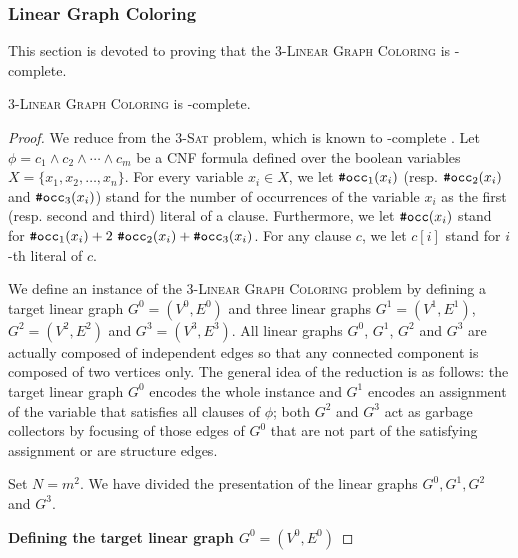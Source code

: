 \subsubsection{Linear Graph Coloring}
\label{section:Linear Graph Coloring}

This section is devoted to proving that the
\textsc{$3$-Linear Graph Coloring} is \NP-complete.

\begin{proposition}
  \label{proposition:3-Linear Graph Coloring is NP-complete}
  \textsc{$3$-Linear Graph Coloring} is \NP-complete.
\end{proposition}

\begin{proof}
  We reduce from the \textsc{$3$-Sat} problem, which is known to
  \NP-complete \cite{DBLP:conf/coco/Karp72}.
  Let $\phi = c_1 \wedge c_2 \wedge \cdots \wedge c_m$ be a CNF formula
  defined over the boolean variables $X =\{x_1, x_2, \dots, x_n\}$.
  For every variable $x_{i} \in X$,
  we let $\operatorname{\texttt{\#occ}}_1(x_{i})$ (resp. $\operatorname{\texttt{\#occ}}_2(x_{i})$ and $\operatorname{\texttt{\#occ}}_3(x_{i})$)
  stand for the number of occurrences of the variable $x_{i}$ as the first (resp. second and third)
  literal of a clause.
  Furthermore, we let $\operatorname{\texttt{\#occ}}(x_{i})$ stand for
  $\operatorname{\texttt{\#occ}}_1(x_{i}) + 2\,\operatorname{\texttt{\#occ}}_2(x_{i}) + \operatorname{\texttt{\#occ}}_3(x_{i})$.
  For any clause $c$, we let $c[i]$ stand for
  $i$-th literal of $c$.

  We define an instance of the \textsc{$3$-Linear Graph Coloring} problem by defining a
  target linear graph $G^{0} = (V^{0}, E^{0})$
  and three linear graphs
  $G^{1} = (V^{1}, E^{1})$, $G^{2} = (V^{2}, E^{2})$ and $G^{3} = (V^{3}, E^{3})$.
  All linear graphs $G^{0}$, $G^{1}$, $G^{2}$ and $G^{3}$ are actually composed
  of independent edges so that any connected component is composed of two vertices only.
  The general idea of the reduction is as follows:
  the target linear graph $G^{0}$ encodes the whole instance
  and $G^{1}$ encodes an assignment of the variable that satisfies all clauses of $\phi$;
  both $G^{2}$ and $G^{3}$ act as garbage collectors by focusing of those edges of $G^{0}$
  that are not part of the satisfying assignment or are structure edges.

  Set $N=m^2$.
  We have divided the presentation of the linear graphs $G^{0}, G^{1}, G^{2}$ and $G^{3}$.

  \medskip
  \textbf{Defining the target linear graph $G^{0} = (V^{0}, E^{0})$}
  \medskip


\end{proof}

